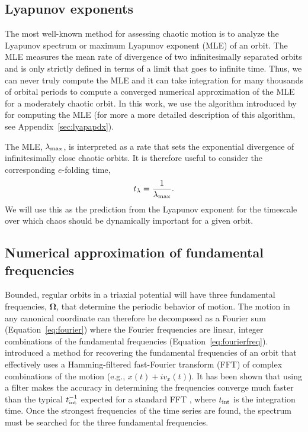 \documentclass[letterpaper,12pt,preprint]{aastex}
\newcommand{\bs}[1]{\boldsymbol{#1}}
\newcommand{\inttime}{t_{\rm int}}
\begin{document}
\subsection{Lyapunov exponents} \label{sec:lyap}

The most well-known method for assessing chaotic motion is to analyze the Lyapunov spectrum or maximum Lyapunov exponent (MLE) of an orbit. The MLE measures the mean rate of divergence of two infinitesimally separated orbits and is only strictly defined in terms of a limit that goes to infinite time. Thus, we can never truly compute the MLE and it can take integration for many thousands of orbital periods to compute a converged numerical approximation of the MLE for a moderately chaotic orbit. In this work, we use the algorithm introduced by \cite{wolf85} for computing the MLE (for more a more detailed description of this algorithm, see Appendix~\ref{sec:lyapapdx}).

The MLE, $\lambda_{\rm max}$, is interpreted as a rate that sets the exponential divergence of infinitesimally close chaotic orbits. It is therefore useful to consider the corresponding $e$-folding time, 
\begin{equation}
	t_{\rm \lambda} = \frac{1}{\lambda_{\rm max}}.
\end{equation}
We will use this as the prediction from the Lyapunov exponent for the timescale over which chaos should be dynamically important for a given orbit. 

\subsection{Numerical approximation of fundamental frequencies}\label{sec:naff}

Bounded, regular orbits in a triaxial potential will have three fundamental frequencies, $\bs{\Omega}$, that determine the periodic behavior of motion. The motion in any canonical coordinate can therefore be decomposed as a Fourier sum (Equation~\ref{eq:fourier}) where the Fourier frequencies are linear, integer combinations of the fundamental frequencies (Equation~\ref{eq:fourierfreq}). \cite{laskar93} introduced a method for recovering the fundamental frequencies of an orbit that effectively uses a Hamming-filtered fast-Fourier transform (FFT) of complex combinations of the motion (e.g., $x(t) + i v_x(t)$). It has been shown that using a filter makes the accuracy in determining the frequencies converge much faster than the typical $\inttime^{-1}$ expected for a standard FFT \citep{laskar99}, where $\inttime$ is the integration time. Once the strongest frequencies of the time series are found, the spectrum must be searched for the three fundamental frequencies.
\end{document}
